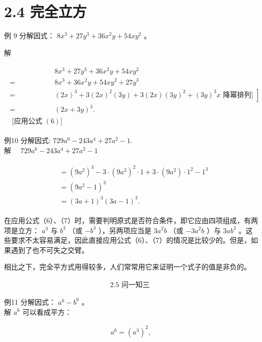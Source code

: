 \documentclass[10pt]{article}
\begin{document}
\section*{2.4 完全立方}
例 9 分解因式： $8 x^{3}+27 y^{3}+36 x^{2} y+54 x y^{2}$ 。

解

\begin{align*}
\begin{array}{rlr} 
& 8 x^{3}+27 y^{3}+36 x^{2} y+54 x y^{2} & \\
= & 8 x^{3}+36 x^{2} y+54 x y^{2}+27 y^{3} & \\
= & \left.(2 x)^{3}+3(2 x)^{2}(3 y)+3(2 x)(3 y)^{2}+(3 y)^{3} x \text { 降幂排列] }\right] \\
= & (2 x+3 y)^{3} . & \\
\text { [应用公式 }(6)]
\end{array}
\end{align*}

例10 分解因式: $729 a^{6}-243 a^{4}+27 a^{2}-1$.\\
解 $\quad 729 a^{6}-243 a^{4}+27 a^{2}-1$

\begin{align*}
\begin{aligned}
& =\left(9 a^{2}\right)^{3}-3 \cdot\left(9 a^{2}\right)^{2} \cdot 1+3 \cdot\left(9 a^{2}\right) \cdot 1^{2}-1^{3} \\
& =\left(9 a^{2}-1\right)^{3} \\
& =(3 a+1)^{3}(3 a-1)^{3} .
\end{aligned}
\end{align*}

在应用公式（6）、（7）时，需要判明原式是否符合条件，即它应由四项组成，有两项是立方： $a^{3}$ 与 $b^{3}$ （或 $-b^{3}$ ），另两项应当是 $3 a^{2} b$ （或 $-3 a^{2} b$ ）与 $3 a b^{2}$ 。这些要求不太容易满足，因此直接应用公式（6）、（7）的情况是比较少的。但是，如果遇到了也不可失之交臂。

相比之下，完全平方式用得较多，人们常常用它来证明一个式子的值是非负的。

\begin{align*}
2.5 \text { 问一知三 }
\end{align*}

例11 分解因式： $a^{6}-b^{6}$ 。\\
解 $a^{6}$ 可以看成平方：

\begin{align*}
a^{6}=\left(a^{3}\right)^{2},
\end{align*}
\end{document}
